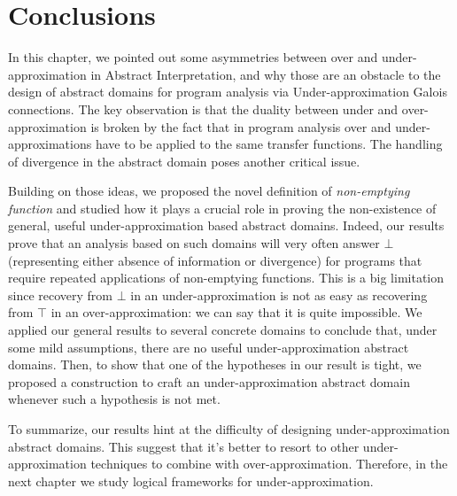 \section{Conclusions}
In this chapter, we pointed out some asymmetries between over and under-approximation in Abstract Interpretation, and why those are an obstacle to the design of abstract domains for program analysis via Under-approximation Galois connections. The key observation is that the duality between under and over-approximation is broken by the fact that in program analysis over and under-approximations have to be applied to the same transfer functions. The handling of divergence in the abstract domain poses another critical issue.

Building on those ideas, we proposed the novel definition of \emph{non-emptying function} and studied how it plays a crucial role in proving the non-existence of general, useful under-approximation based abstract domains. Indeed, our results prove that an analysis based on such domains will very often answer $\bot$ (representing either absence of information or divergence) for programs that require repeated applications of non-emptying functions. This is a big limitation since recovery from $\bot$ in an under-approximation is not as easy as recovering from $\top$ in an over-approximation: we can say that it is quite impossible.
We applied our general results to several concrete domains to conclude that, under some mild assumptions, there are no useful under-approximation abstract domains. Then, to show that one of the hypotheses in our result is tight, we proposed a construction to craft an under-approximation abstract domain whenever such a hypothesis is not met.

To summarize, our results hint at the difficulty of designing under-approximation abstract domains. This suggest that it's better to resort to other under-approximation techniques to combine with over-approximation. Therefore, in the next chapter we study logical frameworks for under-approximation.

